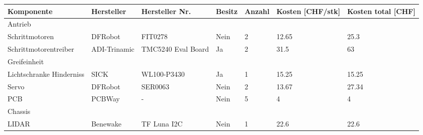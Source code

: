 \documentclass[main.tex]{subfiles} %
\begin{document}
\begin{table}[h]
    \centering
    \scriptsize %
    \begin{tabular}{|p{3cm}|p{2.5cm}|p{3cm}|p{1cm}|p{1cm}|p{1.5cm}|p{1cm}|}
        \hline
        \textbf{Komponente}                    & \textbf{Hersteller}   & \textbf{Hersteller Nr.} & \textbf{Besitz} & \textbf{Anzahl}& \textbf{Kosten [CHF/stk]} & \textbf{Kosten total [CHF]} \\ \hline
        \rowcolor{lightgray} Antrieb           &                       &                         &                 &                &                           &                             \\ \hline
        Schrittmotoren                         & DFRobot               & FIT0278                 & Nein            & 2              & 12.65                     & 25.3                          \\ \hline
        Schrittmotorentreiber                  & ADI-Trinamic          & TMC5240 Eval Board      & Ja              & 2              & 31.5                      & 63                          \\ \hline
        \rowcolor{lightgray} Greifeinheit      &                       &                         &                 &                &                           &                             \\ \hline
        Lichtschranke Hinderniss               & SICK                  & WL100-P3430             & Ja              & 1              & 15.25                     & 15.25                       \\ \hline
        Servo                                  & DFRobot               & SER0063                 & Nein            & 2              & 13.67                     & 27.34                       \\ \hline
        PCB                                    & PCBWay                & -                       & Nein            & 5              & 4                         & 4                           \\ \hline        
        \rowcolor{lightgray} Chassis           &                       &                         &                 &                &                           &                             \\ \hline
        LIDAR                                  & Benewake              & TF Luna I2C             & Nein            & 1              & 22.6                      & 22.6                        \\ \hline

\end{tabular}
\end{table}
\end{document}

